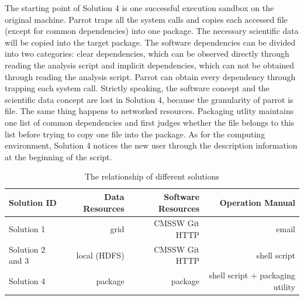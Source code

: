 \documentclass{acm_proc_article-sp}
\begin{document}
The starting point of Solution 4 is one successful execution sandbox on the original machine. 
Parrot traps all the system calls and copies each accessed file (except for common dependencies) into one package.
The necessary scientific data will be copied into the target package.
The software dependencies can be divided into two categories: clear dependencies, which can be observed directly through reading the analysis script and implicit dependencies,
which can not be obtained through reading the analysis script. 
Parrot can obtain every dependency through trapping each system call.
Strictly speaking, the software concept and the scientific data concept are lost in Solution 4, because
the granularity of parrot is file.
The same thing happens to networked resources.
Packaging utlity maintains one list of common dependencies and first judges whether the file belongs to this list before trying to copy one file into the package.
As for the computing environment, Solution 4 notices the new user through the description information at the beginning of the script.

\begin{table}
    \centering
    \begin{tabular}{|l|r|r|r|}
        \hline
        Solution ID & Data Resources & Software Resources & Operation Manual \\ \hline
        Solution 1& grid & CMSSW Git HTTP & email \\ \hline
        Solution 2 and 3& local (HDFS) & CMSSW Git HTTP & shell script \\ \hline
        Solution 4& package & package & shell script + packaging utility \\ \hline
    \end{tabular}
    \caption{The relationship of different solutions}
    \label{table:relationship}
\end{table}


\end{document}

